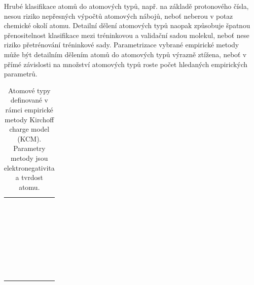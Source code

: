 
Hrubé klasifikace atomů do atomových typů, např. na základě protonového čísla, nesou riziko nepřesných výpočtů atomových nábojů, neboť neberou v potaz chemické okolí atomu. Detailní dělení atomových typů naopak způsobuje špatnou přenositelnost klasifikace mezi tréninkovou a validační sadou molekul, neboť nese riziko přetrénování tréninkové sady. Parametrizace vybrané empirické metody může být detailním dělením atomů do atomových typů výrazně ztížena, neboť v přímé závislosti na množství atomových typů roste počet hledaných empirických parametrů.
\medskip
\begin{table}[h]
    \centering
    \begin{tabular}{c|c}
         &  \\
         &  \\
         &  \\
         &  \\
         &  \\
         &  \\
         &  \\
         &  \\
         &  \\
         &  \\
         &  \\
         &  \\
         &  \\
         &  \\
         &  \\
         &  \\
         &  \\
         &  \\
         &  \\
         &  \\
         &  \\
         &  \\
         &  \\
         &  \\
         &  \\
         &  \\
         &  \\
         &  \\
         &  \\
         &  \\
         &  \\
         &  \\

    \end{tabular}
    \caption{Atomové typy definované v rámci empirické metody Kirchoff charge model (KCM). Parametry metody jsou elektronegativita a tvrdost atomu.}
    \label{atom_types_examples}
\end{table}

